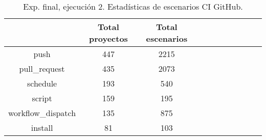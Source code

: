 \begin{table}
  \centering
  \caption{Exp. final, ejecución 2. Estadísticas de escenarios CI GitHub.}
  \label{tab:tabla_f2_5}

\begin{footnotesize}
\renewcommand{\arraystretch}{1.5} %
\begin{tabular}{ccccccccccc}
  \hline
  {} &  Total proyectos &  Total escenarios \\
  \hline
  push                        &                 447 &          2215 \\
  pull\_request                &                 435 &          2073 \\
  schedule                    &                 193 &           540 \\
  script                      &                 159 &           195 \\
  workflow\_dispatch           &                 135 &           875 \\
  install                     &                  81 &           103 \\

\end{tabular}
\end{footnotesize}
\end{table}
